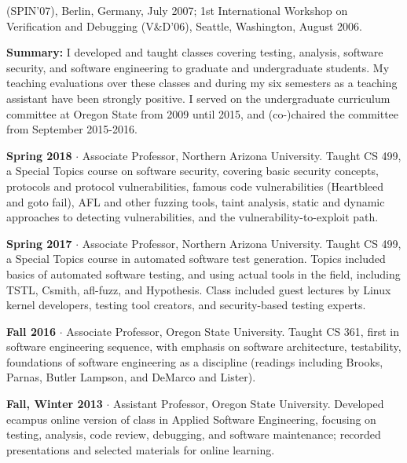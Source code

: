 \documentclass[ComputerScience]{vita}
\begin{document}
\begin{vita}
\begin{Panel and Committee Service}
(SPIN'07), Berlin, Germany, July 2007; 1st International Workshop on Verification and Debugging (V\&D'06), Seattle, Washington, August 2006.
\end{Panel and Committee Service}


\begin{Teaching}
\item {\bf Summary:} I developed and taught classes covering testing,
  analysis, software security, and software engineering to graduate and undergraduate students.  My teaching evaluations over these classes and during my six semesters as a teaching assistant have been strongly positive.  I served on the undergraduate curriculum committee at Oregon State from 2009 until 2015, and (co-)chaired the committee from September 2015-2016.

\item{\bf Spring 2018} $\cdot$ Associate Professor, Northern Arizona
  University.  Taught CS 499, a Special Topics course on software
  security, covering basic security concepts, protocols and protocol
  vulnerabilities, famous code vulnerabilities (Heartbleed and goto fail), AFL and other
  fuzzing tools, taint analysis, static and dynamic approaches to
  detecting vulnerabilities, and the vulnerability-to-exploit path. 

\item{\bf Spring 2017} $\cdot$ Associate Professor, Northern Arizona University.  Taught CS 499, a Special Topics course in automated software test generation.  Topics included basics of automated software testing, and using actual tools in the field, including TSTL, Csmith, afl-fuzz, and Hypothesis.  Class included guest lectures by Linux kernel developers, testing tool creators, and security-based testing experts.

\item{\bf Fall 2016} $\cdot$ Associate Professor, Oregon State University.  Taught CS 361, first in software engineering sequence, with emphasis on software architecture, testability, foundations of software engineering as a discipline (readings including Brooks, Parnas, Butler Lampson, and DeMarco and Lister).

\item{\bf Fall, Winter 2013} $\cdot$ Assistant Professor, Oregon State University.  Developed ecampus online version of class in Applied Software Engineering, focusing on testing, analysis, code review, debugging, and software maintenance; recorded presentations and selected materials for online learning.


\end{Teaching}
\end{vita}
\end{document}
